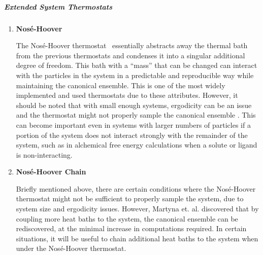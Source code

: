 \documentclass[9pt,bestpractices]{livecoms}
\begin{document}
\subparagraph{Extended System Thermostats}
\begin{enumerate}[listparindent=\parindent]

\item {\bf Nos\'{e}-Hoover}

   The Nos\'{e}-Hoover thermostat~\cite{thermostatAlgorithms2005} essentially abstracts away the thermal bath from the previous thermostats and condenses it into a singular additional degree of freedom.
    This bath with a ``mass'' that can be changed can interact with the particles in the system in a predictable and reproducible way while maintaining the
    canonical ensemble.
    This is one of the most widely implemented and used thermostats due to these attributes.
    However, it should be noted that with small enough systems, ergodicity can be an issue and the thermostat might not properly sample the canonical ensemble \cite{martyna1992nose,thermostatAlgorithms2005}. 
    This can become important even in systems with larger numbers of particles if a portion of the system does not interact strongly with the remainder of the system, such as in alchemical free energy calculations when a solute or ligand is non-interacting.
    
    
\item {\bf Nos\'{e}-Hoover Chain}

    Briefly mentioned above, there are certain conditions where the Nos\'{e}-Hoover thermostat might not be sufficient to properly sample the system, due to
   system size and ergodicity issues\cite{martyna1992nose, thermostatAlgorithms2005}. 
    However, Martyna et. al.  \cite{martyna1992nose} discovered that by coupling more heat baths to the system, the canonical ensemble can be rediscovered, at the minimal increase in computations required. In certain situations, it will be useful to chain additional heat baths to the system when under the Nos\'{e}-Hoover thermostat.

\end{enumerate}
\end{document}
